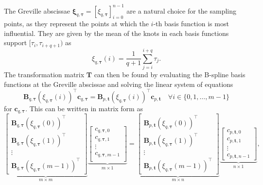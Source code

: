 The Greville abscissae $\boldsymbol \xi_{q,\boldsymbol \tau}=[\xi_{q,\boldsymbol \tau}]_{i=0}^{n-1}$ are a natural choice for the sampling points, as they represent the points at which the $i$-th basis function is most influential. 
They are given by the mean of the knots in each basis functions support $[\tau_i, \tau_{i+q+1})$ as
\begin{equation}\label{eq:greville-abscissae}
    \xi_{q,\boldsymbol \tau}(i) = \frac{1}{q+1} \sum_{j=i}^{i+q} \tau_j.
\end{equation}
The transformation matrix $\mathbf T$ can then be found by evaluating the B-spline basis functions at the Greville abscissae and solving the linear system of equations
\begin{equation}\label{eq:transformation-matrix-equation}
    \mathbf B_{q,\boldsymbol \tau}(\xi_{q,\boldsymbol \tau}(i))^\top \mathbf c_{q, \boldsymbol \tau} = \mathbf B_{p,\mathbf t}(\xi_{q,\boldsymbol \tau}(i))^\top \mathbf c_{p, \mathbf t} \quad \forall i\in\{0,1,\ldots,m-1\}
\end{equation}
for $\mathbf c_{q, \boldsymbol \tau}$. This can be written in matrix form as
\begin{equation}\label{eq:transformation-matrix}
    \underbrace{\begin{bmatrix}
        \mathbf B_{q,\boldsymbol \tau}(\xi_{q,\boldsymbol \tau}(0))^\top \\
        \mathbf B_{q,\boldsymbol \tau}(\xi_{q,\boldsymbol \tau}(1))^\top \\
        \vdots                                                             \\
        \mathbf B_{q,\boldsymbol \tau}(\xi_{q,\boldsymbol \tau}(m-1))^\top
    \end{bmatrix}}_{m \times m}
    \underbrace{\begin{bmatrix}
        c_{q, \boldsymbol \tau, 0}   \\
        c_{q, \boldsymbol \tau, 1}   \\
        \vdots                       \\
        c_{q, \boldsymbol \tau, m-1} \\
    \end{bmatrix}}_{m \times 1}
    = 
    \underbrace{\begin{bmatrix}
        \mathbf B_{p,\mathbf t}(\xi_{q,\boldsymbol \tau}(0))^\top  \\
        \mathbf B_{p,\mathbf t}(\xi_{q,\boldsymbol \tau}(1))^\top  \\
        \vdots                                                       \\
        \mathbf B_{p,\mathbf t}(\xi_{q,\boldsymbol \tau}(m-1))^\top
    \end{bmatrix}}_{m \times n}
    \underbrace{\begin{bmatrix}
        c_{p, \mathbf t, 0}   \\
        c_{p, \mathbf t, 1}   \\
        \vdots                \\
        c_{p, \mathbf t, n-1}
    \end{bmatrix}}_{n \times 1},
\end{equation}
